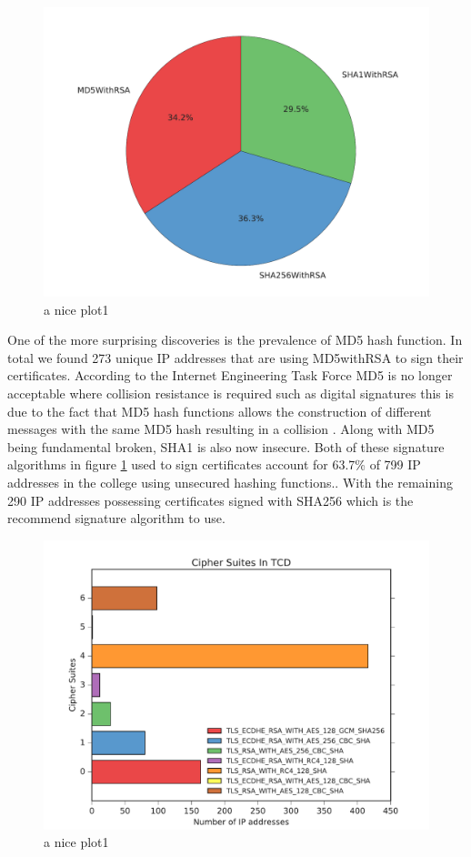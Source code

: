 \documentclass[a4wide,leqno,12pt]{report}
\begin{document}
\begin{figure}[h!]
\includegraphics[scale=.5]{pdf_images/signatureAlgorithms}
\caption{a nice plot1}
\label{fig:signatureAlgorithms}
\end{figure}

One of the more surprising discoveries is the prevalence of MD5 hash function. In total we found 273 unique IP addresses that are using MD5withRSA to sign their certificates. According to the Internet Engineering Task Force MD5 is no longer acceptable where collision resistance is required
such as digital signatures \cite{turner2011updated} this is due to the fact that MD5 hash functions allows the construction of different messages with the same MD5 hash resulting in a collision \cite{md5}. Along with MD5 being fundamental broken, SHA1 is also now insecure. Both of these signature algorithms in figure \ref{fig:signatureAlgorithms} used to sign certificates account for 63.7\% of 799 IP addresses in the college using unsecured hashing functions.\cite{ssllabs}. With the remaining 290 IP addresses possessing certificates signed with SHA256 which is the recommend signature algorithm to use\cite{ssllabs}.

\begin{figure}[h!]
\includegraphics[scale=.5]{pdf_images/CipherSuitesInTCD}
\caption{a nice plot1}
\label{fig:cipherSuites}
\end{figure}
\end{document}
